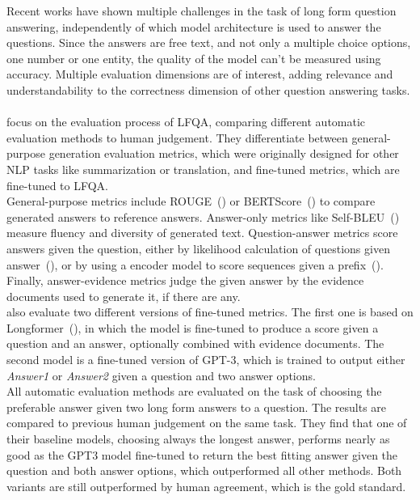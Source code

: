 Recent works have shown multiple challenges in the task of long form question answering, independently of which model architecture is used to answer the questions.
Since the answers are free text, and not only a multiple choice options, one number or one entity, the quality of the model can't be measured using accuracy.
Multiple evaluation dimensions are of interest, adding relevance and understandability to the correctness dimension of other question answering tasks.
\\\\  

\cite{xu:2023} focus on the evaluation process of LFQA, comparing different automatic evaluation methods to human judgement.
They differentiate between general-purpose generation evaluation metrics, which were originally designed for other NLP tasks like summarization or translation, and fine-tuned metrics, which are fine-tuned to LFQA.
\\
General-purpose metrics include ROUGE~(\cite{lin:2004}) or BERTScore~(\cite{zhang:2019}) to compare generated answers to reference answers.
Answer-only metrics like Self-BLEU~(\cite{zhu:2018}) measure fluency and diversity of generated text.
Question-answer metrics score answers given the question, either by likelihood calculation of questions given answer~(\cite{sanh:2021}), or by using a encoder model to score sequences given a prefix~(\cite{krishna:2022}).
Finally, answer-evidence metrics judge the given answer by the evidence documents used to generate it, if there are any.
\\
\cite{xu:2023} also evaluate two different versions of fine-tuned metrics.
The first one is based on Longformer~(\cite{beltagy:2020}), in which the model is fine-tuned to produce a score given a question and an answer, optionally combined with evidence documents.
The second model is a fine-tuned version of GPT-3, which is trained to output either \emph{Answer1} or \emph{Answer2} given a question and two answer options.
\\
All automatic evaluation methods are evaluated on the task of choosing the preferable answer given two long form answers to a question.
The results are compared to previous human judgement on the same task.
They find that one of their baseline models, choosing always the longest answer, performs nearly as good as the GPT3 model fine-tuned to return the best fitting answer given the question and both answer options, which outperformed all other methods.
Both variants are still outperformed by human agreement, which is the gold standard.
\\\\

